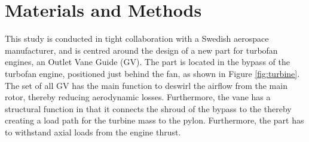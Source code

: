 \documentclass[aerospace,article,submit,moreauthors,pdftex]{Definitions/mdpi}
\newcommand{\Jakob}[1]{{{\color{orange}{\itshape{#1}}\color{black}}
    }{\ignorespaces}}
\newcommand{\revision}[1]{{{\color{ForestGreen}{{#1}}\color{black}}
    }{\ignorespaces}}
\begin{document}











\section{Materials and Methods}\label{sec:method}
This study is conducted in tight collaboration with a Swedish aerospace manufacturer, and is centred around the design of a new part for turbofan engines, an Outlet Vane Guide (\ac{GV}).
The part is located in the bypass of the turbofan engine, positioned just behind the fan, as shown in Figure \ref{fig:turbine}.
The set of all \ac{GV} has the main function to deswirl the airflow from the main rotor, thereby reducing aerodynamic losses.
Furthermore, the vane has a structural function in that it connects the shroud of the bypass to the \revision{engine core,} thereby creating a load path for the turbine mass to the pylon.
Furthermore, the part has to withstand axial loads from the engine thrust.
\end{document}
